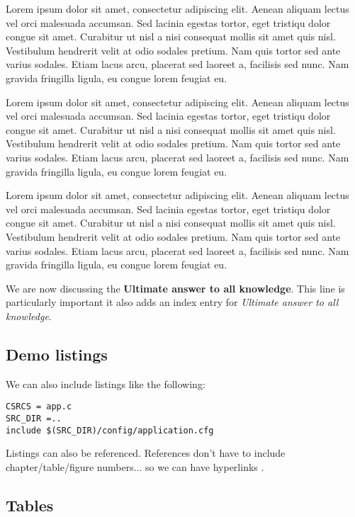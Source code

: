 Lorem ipsum dolor sit amet, consectetur adipiscing elit. Aenean aliquam lectus vel orci malesuada accumsan. Sed lacinia egestas tortor, eget tristiqu dolor congue sit amet. Curabitur ut nisl a nisi consequat mollis sit amet quis nisl. Vestibulum hendrerit velit at odio sodales pretium. Nam quis tortor sed ante varius sodales. Etiam lacus arcu, placerat sed laoreet a, facilisis sed nunc. Nam gravida fringilla ligula, eu congue lorem feugiat eu.


Lorem ipsum dolor sit amet, consectetur adipiscing elit. Aenean aliquam lectus vel orci malesuada accumsan. Sed lacinia egestas tortor, eget tristiqu dolor congue sit amet. Curabitur ut nisl a nisi consequat mollis sit amet quis nisl. Vestibulum hendrerit velit at odio sodales pretium. Nam quis tortor sed ante varius sodales. Etiam lacus arcu, placerat sed laoreet a, facilisis sed nunc. Nam gravida fringilla ligula, eu congue lorem feugiat eu.


Lorem ipsum dolor sit amet, consectetur adipiscing elit. Aenean aliquam lectus vel orci malesuada accumsan. Sed lacinia egestas tortor, eget tristiqu dolor congue sit amet. Curabitur ut nisl a nisi consequat mollis sit amet quis nisl. Vestibulum hendrerit velit at odio sodales pretium. Nam quis tortor sed ante varius sodales. Etiam lacus arcu, placerat sed laoreet a, facilisis sed nunc. Nam gravida fringilla ligula, eu congue lorem feugiat eu.

We are now discussing the \textbf{Ultimate answer to all knowledge}.
This line is particularly important it also adds an index entry for \textit{Ultimate answer to all knowledge}.

\subsection{Demo listings}

We can also include listings like the following:

\lstset{language=make,caption=Application Makefile,label=lst:app-make}
\begin{lstlisting}
CSRCS = app.c
SRC_DIR =..
include $(SRC_DIR)/config/application.cfg
\end{lstlisting}

Listings can also be referenced. References don't have to include chapter/table/figure numbers... so we can have hyperlinks .

\subsection{Tables}

